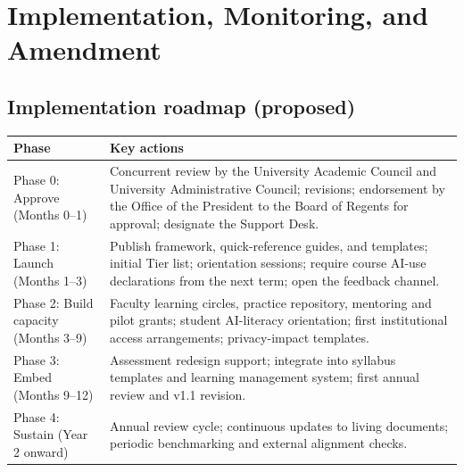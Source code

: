 \section{Implementation, Monitoring, and Amendment}\label{sec:implementation}

\subsection{Implementation roadmap (proposed)}
\begin{longtable}{@{}p{3.3cm}p{11.7cm}@{}}
\toprule
Phase & Key actions \\
\midrule
\endhead
Phase 0: Approve (Months 0--1) & Concurrent review by the University Academic Council and University Administrative Council; revisions; endorsement by the Office of the President to the Board of Regents for approval; designate the Support Desk. \\
Phase 1: Launch (Months 1--3) & Publish framework, quick-reference guides, and templates; initial Tier list; orientation sessions; require course AI-use declarations from the next term; open the feedback channel. \\
Phase 2: Build capacity (Months 3--9) & Faculty learning circles, practice repository, mentoring and pilot grants; student AI-literacy orientation; first institutional access arrangements; privacy-impact templates. \\
Phase 3: Embed (Months 9--12) & Assessment redesign support; integrate into syllabus templates and learning management system; first annual review and v1.1 revision. \\
Phase 4: Sustain (Year 2 onward) & Annual review cycle; continuous updates to living documents; periodic benchmarking and external alignment checks. \\
\bottomrule
\end{longtable}

